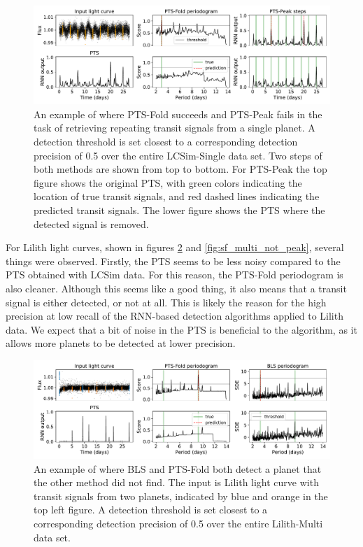 \begin{figure}
    \centering
    \includegraphics[width=\linewidth]{Experiments/Figures/Cases/sf_single_fold_not_peak_1.pdf}
    \caption{An example of where PTS-Fold succeeds and PTS-Peak fails in the task of retrieving repeating transit signals from a single planet. A detection threshold is set closest to a corresponding detection precision of 0.5 over the entire LCSim-Single data set. Two steps of both methods are shown from top to bottom. For PTS-Peak the top figure shows the original PTS, with green colors indicating the location of true transit signals, and red dashed lines indicating the predicted transit signals. The lower figure shows the PTS where the detected signal is removed.}
    \label{fig:sf_single_fold_not_peak}
\end{figure}
For Lilith light curves, shown in figures \ref{fig:sf_multi_viceversa} and \ref{fig:sf_multi_not_peak}, several things were observed. Firstly, the PTS seems to be less noisy compared to the PTS obtained with LCSim data. For this reason, the PTS-Fold periodogram is also cleaner.  Although this seems like a good thing, it also means that a transit signal is either detected, or not at all. This is likely the reason for the high precision at low recall of the RNN-based detection algorithms applied to Lilith data. We expect that a bit of noise in the PTS is beneficial to the algorithm, as it allows more planets to be detected at lower precision. 

\begin{figure}
    \centering
    \includegraphics[width=\linewidth]{Experiments/Figures/Cases/sf_multi_vice.pdf}
    \caption{An example of where BLS and PTS-Fold both detect a planet that the other method did not find. The input is Lilith light curve with transit signals from two planets, indicated by blue and orange in the top left figure. A detection threshold is set closest to a corresponding detection precision of 0.5 over the entire Lilith-Multi data set.}
    \label{fig:sf_multi_viceversa}
\end{figure}

